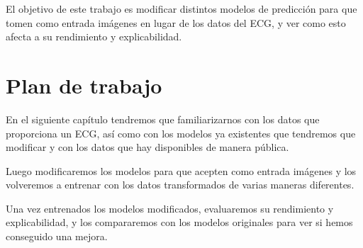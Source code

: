 El objetivo de este trabajo es modificar distintos modelos de predicción para que tomen como entrada imágenes en lugar de los datos del \ac{ECG}, y ver como esto afecta a su rendimiento y explicabilidad.

\section{Plan de trabajo}
En el siguiente capítulo tendremos que familiarizarnos con los datos que proporciona un \ac{ECG}, así como con los modelos ya existentes que tendremos que modificar y con los datos que hay disponibles de manera pública.

Luego modificaremos los modelos para que acepten como entrada imágenes y los volveremos a entrenar con los datos transformados de varias maneras diferentes.

Una vez entrenados los modelos modificados, evaluaremos su rendimiento y explicabilidad, y los compararemos con los modelos originales para ver si hemos conseguido una mejora.


